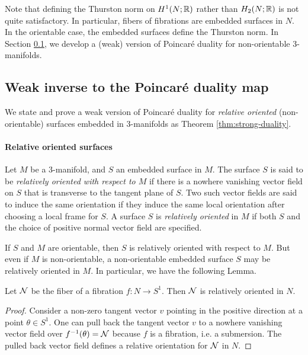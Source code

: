 Note that defining the Thurston norm on $H^1(N; \mathbb{R})$ rather than $H_2(N; \mathbb{R})$ is not quite satisfactory.
In particular, fibers of fibrations are embedded surfaces in $N$.  In the orientable case, the embedded surfaces define the Thurston norm.
In Section \ref{sec:weak-inverse-poinc}, we develop a (weak) version of Poincar\'e duality for non-orientable 3-manifolds.

\subsection{Weak inverse to the Poincar\'e duality map}
\label{sec:weak-inverse-poinc}

We state and prove a weak version of Poincar\'e duality for {\it relative oriented} (non-orientable) surfaces embedded in 3-manifolds as Theorem \ref{thm:strong-duality}.

\paragraph{Relative oriented surfaces}
  Let $M$ be a $3$-manifold, and $S$ an embedded surface in $M$.
  The surface $S$ is said to be \emph{relatively oriented with respect to $M$} if there is a nowhere vanishing vector field on $S$ that is transverse to the tangent plane of $S$.
  Two such vector fields are said to induce the same orientation if they induce the same local orientation after choosing a local frame for $S$.
  A surface $S$ is \emph{relatively oriented} in $M$ if both $S$ and the choice of positive normal vector field are specified.

If $S$ and $M$ are orientable, then $S$ is relatively oriented with respect to $M$.
But even if $M$ is non-orientable, a non-orientable embedded surface $S$ may be relatively oriented in $M$.  In particular, we have the following Lemma.
\begin{lem}
  \label{lem:fibers-relatively-oriented}
  Let $\mathcal{N}$ be the fiber of a fibration $f: N \to S^1$.
  Then $\mathcal{N}$ is relatively oriented in $N$.
\end{lem}
\begin{proof}
Consider a non-zero tangent vector $v$ pointing in the positive direction at a point $\theta \in S^1$.
One can pull back the tangent vector $v$ to a nowhere vanishing vector field over $f^{-1}(\theta) = \mathcal{N}$ because $f$ is a fibration, i.e. a submersion.
The pulled back vector field defines a relative orientation for $\mathcal{N}$ in $N$.
\end{proof}

